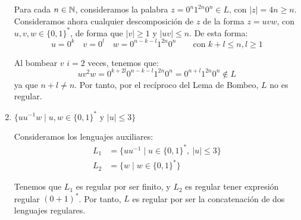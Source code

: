 \begin{ejercicio}
\begin{enumerate}
        Para cada $n\in \mathbb{N}$, consideramos la palabra $z=0^{n}1^{2n}0^{n}\in L$, con $|z|=4n\geq n$. Consideramos ahora cualquier descomposición de $z$ de la forma $z=uvw$, con $u,v,w\in {\{0,1\}}^{\ast}$, de forma que $|v|\geq 1$ y $|uv|\leq n$. De esta forma:
        \begin{equation*}
            u=0^k \quad v=0^l \quad w=0^{n-k-l}1^{2n}0^n\qquad \text{con } k+l\leq n, l\geq 1
        \end{equation*}

        Al bombear $v$ $i=2$ veces, tenemos que:
        \begin{equation*}
            uv^2w = 0^{k+2l}0^{n-k-l}1^{2n}0^n = 0^{n+l}1^{2n}0^n \notin L
        \end{equation*}
        ya que $n+l\neq n$. Por tanto, por el recíproco del Lema de Bombeo, $L$ no es regular.

        \item $\{uu^{-1}w \mid u,w\in {\{0,1\}}^{\ast} \text{\ y\ } |u|\leq 3\}$
        
        Consideramos los lenguajes auxiliares:
        \begin{align*}
            L_1 &= \{uu^{-1}\mid u\in {\{0,1\}}^{\ast},~|u|\leq 3\} \\
            L_2 &= \{w\mid w\in {\{0,1\}}^{\ast}\}
        \end{align*}

        Tenemos que $L_1$ es regular por ser finito, y $L_2$ es regular tener expresión regular $(0+1)^{\ast}$. Por tanto, $L$ es regular por ser la concatenación de dos lenguajes regulares.
    \end{enumerate}
\end{ejercicio}

